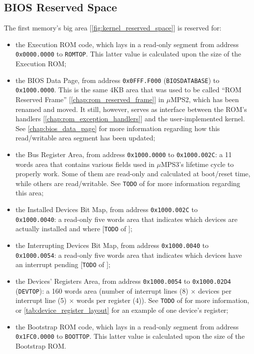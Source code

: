 \documentclass[12pt,a4paper,openright,twoside]{report}
\begin{document}
\subsection{BIOS Reserved Space}
\label{chap:bios_reserved_space}
The first memory's big area [\autoref{fig:kernel_reserved_space}] is reserved for:
\begin{itemize}
	\item the Execution ROM code, which lays in a read-only segment from address \texttt{0x0000.0000} to \texttt{ROMTOP}. This latter value is calculated upon the size of the Execution ROM;
	\item the BIOS Data Page, from address \texttt{0x0FFF.F000} (\texttt{BIOSDATABASE}) to \texttt{0x1000.0000}.
	      This is the same 4KB area that was used to be called ``ROM Reserved Frame'' [\autoref{chap:rom_reserved_frame}] in $\mu$MPS2, which has been renamed and moved.
	      It still, however, serves as interface between the ROM's handlers [\autoref{chap:rom_exception_handlers}] and the user-implemented kernel.
	      See \autoref{chap:bios_data_page} for more information regarding how this read/writable area segment has been updated;
	\item the Bus Register Area, from address \texttt{0x1000.0000} to \texttt{0x1000.002C}: a 11 words area that contains various fields used in $\mu$MPS3's lifetime cycle to properly work.
	      Some of them are read-only and calculated at boot/reset time, while others are read/writable.
	      See \texttt{TODO} of \cite{pops} for more information regarding this area;
	\item the Installed Devices Bit Map, from address \texttt{0x1000.002C} to \\ \texttt{0x1000.0040}: a read-only five words area that indicates which devices are actually installed and where [\texttt{TODO} of \cite{pops}];
	\item the Interrupting Devices Bit Map, from address \texttt{0x1000.0040} to \\ \texttt{0x1000.0054}: a read-only five words area that indicates which devices have an interrupt pending [\texttt{TODO} of \cite{pops}];
	\item the Devices' Registers Area, from address \texttt{0x1000.0054} to \texttt{0x1000.02D4} (\texttt{DEVTOP}): a 160 words area (number of interrupt lines (8) $\times$ devices per interrupt line (5) $\times$  words per register (4)). See \texttt{TODO} of \cite{pops} for more information, or \autoref{tab:device_register_layout} for an example of one device's register;
	\item the Bootstrap ROM code, which lays in a read-only segment from address \texttt{0x1FC0.0000} to \texttt{BOOTTOP}. This latter value is calculated upon the size of the Bootstrap ROM.
\end{itemize}
\end{document}
